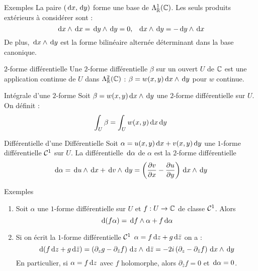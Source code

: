 \documentclass{cours}
\begin{document}
\begin{propositionfr}{Exemples}{}
   La paire $({\rm \, d} x, {\rm \, d} y)$ forme une base de $\Lambda_{\mathbb{R}}^{1}(\mathbb{C})$. Les seuls produits extérieurs à considérer sont : 
        \[
            {\rm \, d} x \land {\rm \, d} x = {\rm \, d} y \land {\rm \, d} y = 0, \ \ {\rm \, d} x \land {\rm \, d} y = -{\rm \, d} y \land {\rm \, d} x
        \]
    De plus, ${\rm \, d} x \land {\rm \, d} y$ est la forme bilinéaire alternée déterminant dans la base canonique. 
\end{propositionfr}

\begin{définition}{$2$-forme différentielle}{}
    Une $2$-forme différentielle $\beta$ sur un ouvert $U$ de $\mathbb{C}$ est une application continue de $U$ dans $\Lambda_{\mathbb{R}}^{2}(\mathbb{C})$ : $\beta = w(x, y){\rm \, d} x \land {\rm \, d} y$ pour $w$ continue. 
\end{définition}

\begin{définition}{Intégrale d'une $2$-forme}{}
    Soit $\beta = w(x, y){\rm \, d} x \land {\rm \, d} y$ une $2$-forme différentielle sur $U$. On définit : 
    \[
        \int_{U}\beta = \int_{U}w(x, y){\rm \, d} x{\rm \, d} y
    \]
\end{définition}
\begin{définition}{Différentielle d'une Différentielle}{}
    Soit $\alpha = u(x, y){\rm \, d} x + v(x, y){\rm \, d} y$ une $1$-forme différentielle $\mathcal{C}^{1}$ sur $U$. La différentielle ${\rm \, d} \alpha$ de $\alpha$ est la $2$-forme différentielle 
    \[
        {\rm \, d} \alpha = {\rm \, d} u\land {\rm \, d} x + {\rm \, d} v \land {\rm \, d} y = \left(\frac{\partial v}{\partial x} - \frac{\partial u}{\partial y}\right){\rm \, d} x \land {\rm \, d} y 
    \]
\end{définition}

\begin{propositionfr}{Exemples}{}
    \begin{enumerate}
        \item Soit $\alpha$ une $1$-forme différentielle sur $U$ et $f : U\to \mathbb{C}$ de classe $\mathcal{C}^{1}$. Alors 
        \[
            {\rm \, d}(f\alpha) = {\rm \, d} f \land \alpha + f{\rm \, d} \alpha
        \]
        \item Si on écrit la $1$-forme différentielle $\mathcal{C}^{1}$ $\alpha = f{\rm \, d} z + g{\rm \, d} \bar{z}$ on a : 
        \[
            {\rm \, d}(f{\rm \, d} z + g {\rm \, d}\bar{z}) = \left(\partial_{z}g - \partial_{\bar{z}}f\right) {\rm \, d} z \land {\rm \, d}\bar{z} = -2i\left(\partial_{z}-\partial_{\bar{z}}f\right){\rm \, d} x \land {\rm \, d} y
        \]
        En particulier, si $\alpha = f{\rm \, d} z$ avec $f$ holomorphe, alors $\partial_{\bar{z}}f = 0$ et ${\rm \, d} \alpha = 0$. 
    \end{enumerate}
\end{propositionfr}
\end{document}
